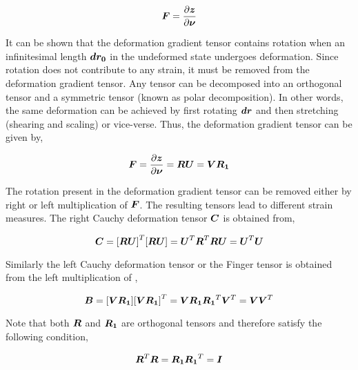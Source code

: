 \begin{equation}
  \matr{F}=\delby{\vect{z}}{\vect{\nu}}
  \label{eqn:deformationgradienttensor}
\end{equation}
 
It can be shown that the deformation gradient tensor contains rotation when an
infinitesimal length $\vect{dr_{0}}$ in the undeformed state undergoes
deformation. Since rotation does not contribute to any strain, it must be
removed from the deformation gradient tensor. Any tensor can be decomposed
into an orthogonal tensor and a symmetric tensor (known as polar
decomposition). In other words, the same deformation can be achieved by first
rotating $\vect{dr}$ and then stretching (shearing and scaling) or
vice-verse. Thus, the deformation gradient tensor can be given by,

\begin{equation}
  \matr{F}=\delby{\vect{z}}{\vect{\nu}}=\matr{R}\matr{U}=\matr{V}\matr{R_{1}}
  \label{eqn:polardecomposition}
\end{equation}
 
The rotation present in the deformation gradient tensor can be removed either
by right or left multiplication of $\matr{F}$. The resulting tensors lead to
different strain measures. The right Cauchy deformation tensor $\matr{C}$ is
obtained from,

\begin{equation}
  \matr{C}=\transpose{[\matr{R}\matr{U}]}[\matr{R}\matr{U}]=\transpose{\matr{U}}\transpose{\matr{R}}\matr{R}\matr{U}=\transpose{\matr{U}}\matr{U}
  \label{eqn:rightcauchy}
\end{equation}

Similarly the left Cauchy deformation tensor or the Finger tensor  is
obtained from the left multiplication of ,

\begin{equation}
  \matr{B}=[\matr{V}\matr{R_{1}}]\transpose{[\matr{V}\matr{R_{1}}]}=\matr{V}\matr{R_{1}}\transpose{\matr{R_{1}}}\transpose{\matr{V}}=\matr{V}\transpose{\matr{V}}
  \label{eqn:leftcauchy}
\end{equation}

\noindent Note that both $\matr{R}$ and $\matr{R_{1}}$ are orthogonal tensors
and therefore satisfy the following condition,

\begin{equation}
  \transpose{\matr{R}}\matr{R}=\matr{R_{1}}\transpose{\matr{R_{1}}}=\matr{I}
  \label{eqn:orthoganality}
\end{equation}

